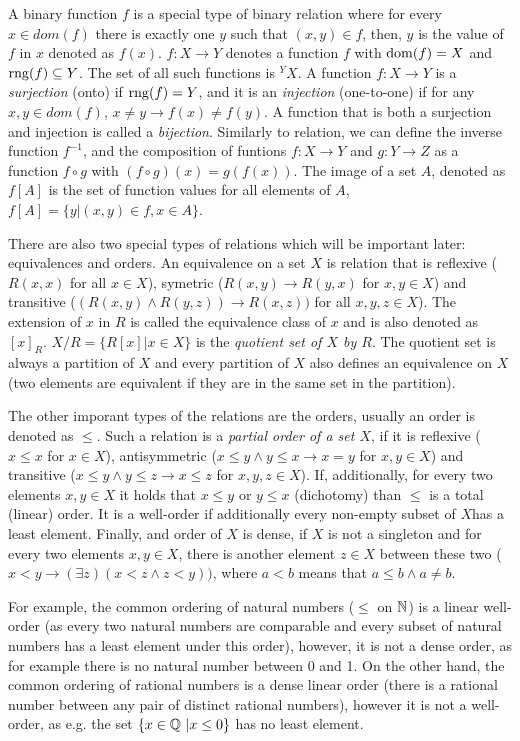 A binary function $f$ is a special type of binary relation where for every $x \in dom(f)$ there is exactly one $y$ such that $(x,y) \in f$, then, $y$ is the value of $f$ in $x$ denoted as $f(x)$. $f: X \to Y$ denotes a function $f$ with $\mathrm{dom}(f) = X$ and $\mathrm{rng}(f) \subseteq Y$. The set of all such functions is $^YX$. A function $f: X \to Y$ is a \emph{surjection} (onto) if $\mathrm{rng}(f)=Y$, and it is an \emph{injection} (one-to-one) if for any $x,y \in dom(f)$, $x \neq y \to f(x) \neq f(y)$. A function that is both a surjection and injection is called a \emph{bijection}. Similarly to relation, we can define the inverse function $f^{-1}$, and the composition of funtions $f:X\to Y$ and $g:Y\to Z$ as a function $f \circ g$ with $(f \circ g)(x) = g(f(x))$. The image of a set $A$, denoted as $f[A]$ is the set of function values for all elements of $A$, $f[A] = \{y |(x,y) \in f, x \in A\}$.

There are also two special types of relations which will be important later: equivalences and orders. An equivalence on a set $X$ is relation that is reflexive ($R(x,x)$ for all $x\in X$), symetric ($R(x,y) \to R(y,x)$ for $x,y \in X$) and transitive ($(R(x,y) \land R(y,z)) \to R(x,z))$ for all $x,y,z \in X$). The extension of $x$ in $R$ is called the equivalence class of $x$ and is also denoted as $[x]_R$. $X/R = \{R[x] | x \in X\}$ is the \emph{quotient set of $X$ by $R$}. The quotient set is always a partition of $X$ and every partition of $X$ also defines an equivalence on $X$ (two elements are equivalent if they are in the same set in the partition). 

The other imporant types of the relations are the orders, usually an order is denoted as $\leq$. Such a relation is a \emph{partial order of a set $X$}, if it is reflexive ($x \leq x$ for $x \in X$), antisymmetric ($x \leq y \land y \leq x \to x = y$ for $x,y\in X$) and transitive ($x \leq y \land y \leq z \to x \leq z$ for $x,y,z \in X$). If, additionally, for every two elements $x,y \in X$ it holds that $x \leq y$ or $y \leq x$ (dichotomy) than $\leq$ is a total (linear) order. It is a well-order if additionally every non-empty subset of $X$has a least element. Finally, and order of $X$ is dense, if $X$ is not a singleton and for every two elements $x,y \in X$, there is another element $z \in X$ between these two ($x < y \to (\exists z) (x < z \land z < y))$, where $a < b$ means that $a \leq b \land a \neq b$. 

For example, the common ordering of natural numbers ($\leq$ on $\mathbb{N}$) is a linear well-order (as every two natural numbers are comparable and every subset of natural numbers has a least element under this order), however, it is not a dense order, as for example there is no natural number between 0 and 1. On the other hand, the common ordering of rational numbers is a dense linear order (there is a rational number between any pair of distinct rational numbers), however it is not a well-order, as e.g. the set $\{x \in \mathbb{Q}\ | x \leq 0\}$ has no least element.

